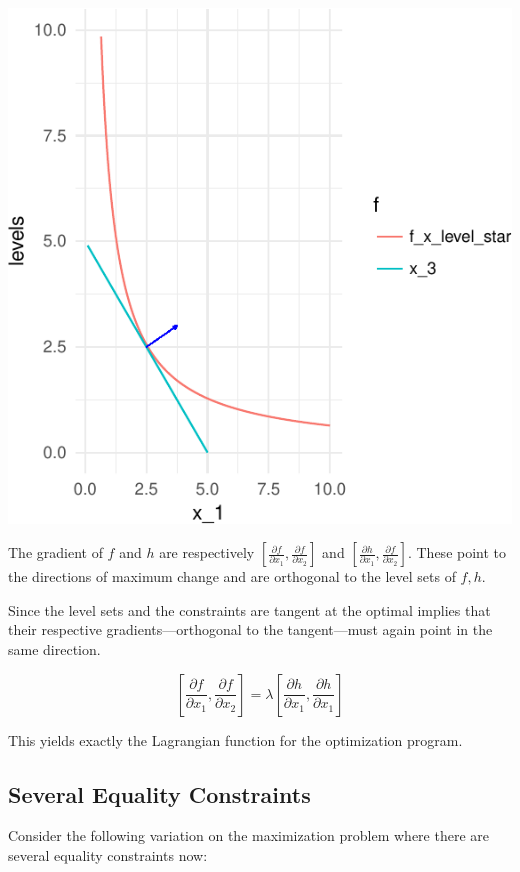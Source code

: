 \documentclass[11pt,]{article}
\begin{document}
\includegraphics{Optimization_2_files/figure-latex/opt_dim_2_eq_grad-1.pdf}

The gradient of \(f\) and \(h\) are respectively
\([\frac{\partial f}{\partial x_1}, \frac{\partial f}{\partial x_2}]\)
and
\([\frac{\partial h}{\partial x_1}, \frac{\partial f}{\partial x_2}]\).
These point to the directions of maximum change and are orthogonal to
the level sets of \(f, h\).

Since the level sets and the constraints are tangent at the optimal
implies that their respective gradients---orthogonal to the
tangent---must again point in the same direction.

\[
[\frac{\partial f}{\partial x_1}, \frac{\partial f}{\partial x_2}] = 
\lambda [\frac{\partial h}{\partial x_1}, \frac{\partial h}{\partial x_1}]
\]

This yields exactly the Lagrangian function for the optimization
program.

\subsection{Several Equality
Constraints}\label{several-equality-constraints}

Consider the following variation on the maximization problem where there
are several equality constraints now:
\end{document}
